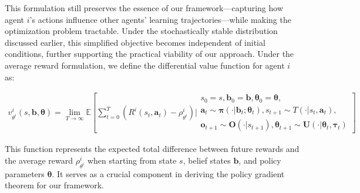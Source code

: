 This formulation still preserves the essence of our framework—capturing how agent $i$'s actions influence other agents' learning trajectories—while making the optimization problem tractable. Under the stochastically stable distribution discussed earlier, this simplified objective becomes independent of initial conditions, further supporting the practical viability of our approach. Under the average reward formulation, we define the differential value function for agent $i$ as:

\begin{align}
    v^i_{\theta^i}(s, \boldsymbol{b}, \boldsymbol{\theta}) = \lim_{T \to \infty} \mathbb{E}\left[ \sum_{t=0}^T \left(R^i(s_t, \boldsymbol{a}_t) - \rho^i_{\theta^i}\right) \Bigg|
    \begin{array}{c}
        s_0=s, \boldsymbol{b}_0= \boldsymbol{b}, \boldsymbol{\theta}_0= \boldsymbol{\theta}, \\
        \boldsymbol{a}_t \sim \boldsymbol{\pi}(\cdot|\boldsymbol{b}_t; \boldsymbol{\theta}_t),
        s_{t+1} \sim T(\cdot|s_t, \boldsymbol{a}_t),                                         \\
        \boldsymbol{o}_{t+1} \sim \boldsymbol{O}(\cdot|s_{t+1}),
        \boldsymbol{\theta}_{t+1} \sim \boldsymbol{U}(\cdot|\boldsymbol{\theta}_t, \boldsymbol{\tau}_t)
    \end{array}
    \right]
\end{align}

This function represents the expected total difference between future rewards and the average reward $\rho^i_{\theta^i}$ when starting from state $s$, belief states $\boldsymbol{b}$, and policy parameters $\boldsymbol{\theta}$. It serves as a crucial component in deriving the policy gradient theorem for our framework.


